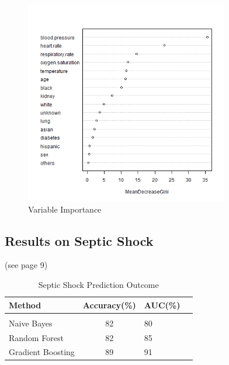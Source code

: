\documentclass[twoside,11pt]{article}
\begin{document}
\begin{figure}[htbp]
	\centering
	\includegraphics[width=3.5in]{rf_var_severe.png} 
	\caption{Variable Importance}
	\label{fig:var}
\end{figure} 


\subsection{Results on Septic Shock}
(see page 9)
\begin{table}[htbp]
	\centering 
	\begin{tabular}{lclc} 
		Method & Accuracy(\%) & AUC(\%) \\ 
		\hline \\[-11pt]
		Naive Bayes & 82 & 80 \\ 
		Random Forest & 82 & 85 \\ 
		Gradient Boosting & 89 & 91 \\ \hline 
	\end{tabular}
	\label{tab:outcome} 
	\caption{Septic Shock Prediction Outcome} 
\end{table}
\end{document}
